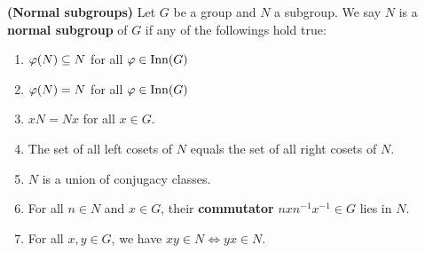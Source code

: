 \documentclass{report}
\begin{document}
\begin{equiv_def}
\textbf{(Normal subgroups)} Let $G$ be a group and $N$ a subgroup. We say $N$ is a \textbf{normal subgroup} of $G$ if any of the followings hold true: 
\begin{enumerate}[label=(\roman*)]
  \item $\pfi  (N) \subseteq N$  for all $\pfi  \in \operatorname{Inn}(G)$
  \item $\pfi  (N)=N$ for all $\pfi  \in \operatorname{Inn}(G)$ 
  \item $xN=Nx$ for all  $x \in G$.  
  \item The set of all left cosets of $N$ equals the set of all right cosets of $N$. 
  \item $N$ is a union of conjugacy classes. 
  \item For all $n \in N$ and $x \in G$, their \textbf{commutator} $nxn^{-1}x^{-1} \in G$ lies in $N$.  
  \item For all $x,y \in G$, we have $xy\in N \iff  yx \in N$. 
\end{enumerate}
\end{equiv_def}
\end{document}
